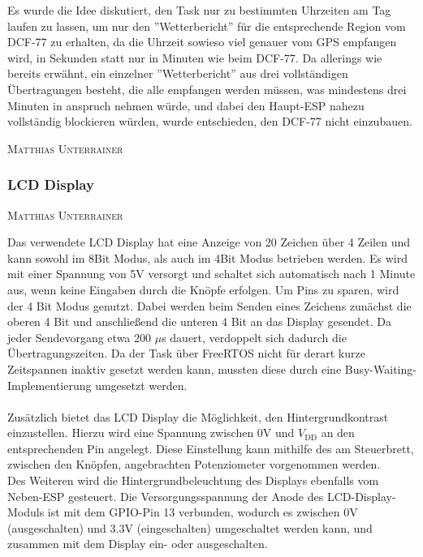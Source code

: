 \documentclass[12pt,a4paper,bibliography=totocnumbered,listof=totocnumbered]{article}
\makeatletter
\newcommand{\chapterauthor}[1]{%
  {\parindent0pt\vspace*{-5pt}%
  \linespread{1.1}\small\scshape#1%
  \par\nobreak\vspace*{3pt}}
  \@afterheading%
}
\makeatother
\begin{document}
Es wurde die Idee diskutiert, den Task nur zu bestimmten Uhrzeiten am Tag laufen zu lassen, um nur den ''Wetterbericht'' für die entsprechende Region vom DCF-77 zu erhalten, da die Uhrzeit sowieso viel genauer vom GPS empfangen wird, in Sekunden statt nur in Minuten wie beim DCF-77. Da allerings wie bereits erwähnt, ein einzelner ''Wetterbericht'' aus drei vollständigen Übertragungen besteht, die alle empfangen werden müssen, was mindestens drei Minuten in anspruch nehmen würde, und dabei den Haupt-ESP nahezu vollständig blockieren würden, wurde entschieden, den DCF-77 nicht einzubauen.

\chapterauthor{Matthias Unterrainer}

\subsubsection{LCD Display}
\chapterauthor{Matthias Unterrainer}
Das verwendete LCD Display hat eine Anzeige von 20 Zeichen über 4 Zeilen und kann sowohl im 8Bit Modus, als auch im 4Bit Modus betrieben werden.
Es wird mit einer Spannung von 5V versorgt und schaltet sich automatisch nach 1 Minute aus, wenn keine Eingaben durch die Knöpfe erfolgen.
Um Pins zu sparen, wird der 4 Bit Modus genutzt. Dabei werden beim Senden eines Zeichens zunächst die oberen 4 Bit und anschließend die unteren 4 Bit an das Display gesendet. Da jeder Sendevorgang etwa 200 $\mu$s dauert, verdoppelt sich dadurch die Übertragungszeiten. Da der Task über FreeRTOS nicht für derart kurze Zeitspannen inaktiv gesetzt werden kann, mussten diese durch eine Busy-Waiting-Implementierung umgesetzt werden.\\\\
Zusätzlich bietet das LCD Display die Möglichkeit, den Hintergrundkontrast einzustellen. Hierzu wird eine Spannung zwischen 0V und $V_{\text{DD}}$ an den entsprechenden Pin angelegt. Diese Einstellung kann mithilfe des am Steuerbrett, zwischen den Knöpfen, angebrachten Potenziometer vorgenommen werden.\\
Des Weiteren wird die Hintergrundbeleuchtung des Displays ebenfalls vom Neben-ESP gesteuert. Die Versorgungsspannung der Anode des LCD-Display-Moduls ist mit dem GPIO-Pin 13 verbunden, wodurch es zwischen 0V (ausgeschalten) und 3.3V (eingeschalten) umgeschaltet werden kann, und zusammen mit dem Display ein- oder ausgeschalten.
\end{document}
